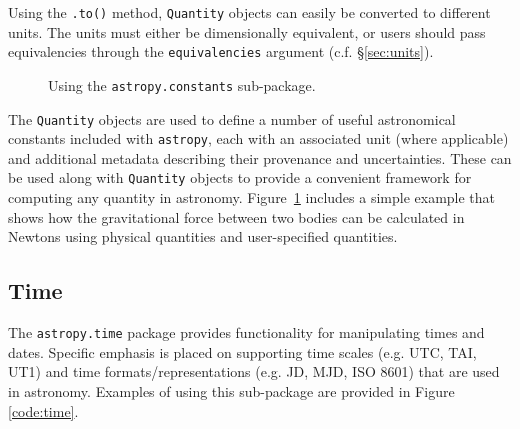 \documentclass[traditabstract]{aa}
\newcommand{\astropy}{\texttt{astropy}\xspace}
\begin{document}
Using the \texttt{.to()} method, \texttt{Quantity} objects can easily be
converted to different units. The units must either be dimensionally
equivalent, or users should pass equivalencies through the
\texttt{equivalencies} argument (c.f. \S\ref{sec:units}).

\begin{figure}
\center
\caption{Using the \texttt{astropy.constants} sub-package.\label{code:constants}}
\vspace{0.1in}
\end{figure}

The \texttt{Quantity} objects are used to define a number of useful
astronomical constants included with \astropy, each with an associated unit
(where applicable) and additional metadata describing their provenance and
uncertainties. These can be used along with \texttt{Quantity} objects to
provide a convenient framework for computing any quantity in astronomy.
Figure~\ref{code:constants} includes a simple example that shows how the
gravitational force between two bodies can be calculated in Newtons using
physical quantities and user-specified quantities.

\subsection{Time}

\label{sec:time}


The \texttt{astropy.time} package provides functionality for manipulating times
and dates. Specific emphasis is placed on supporting time scales (e.g. UTC,
TAI, UT1) and time formats/representations (e.g. JD, MJD, ISO 8601) that are
used in astronomy. Examples of using this sub-package are provided in Figure
\ref{code:time}.
\end{document}
